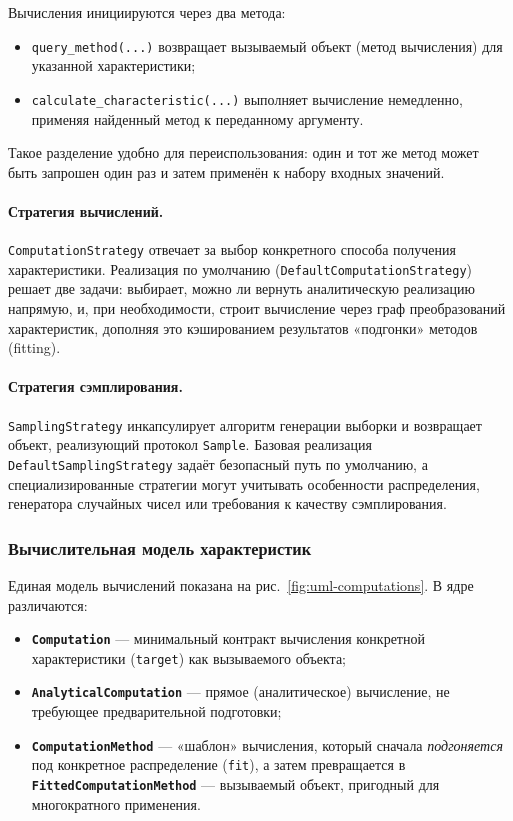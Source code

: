 Вычисления инициируются через два метода:
\begin{itemize}[compact]
  \item \texttt{query\_method(...)} возвращает вызываемый объект (метод вычисления) для указанной характеристики;
  \item \texttt{calculate\_characteristic(...)} выполняет вычисление немедленно, применяя найденный метод к переданному аргументу.
\end{itemize}
Такое разделение удобно для переиспользования: один и тот же метод может быть запрошен один раз и затем применён к набору входных значений.

\paragraph{Стратегия вычислений.}
\texttt{ComputationStrategy} отвечает за выбор конкретного способа получения характеристики. Реализация по умолчанию (\texttt{DefaultComputationStrategy}) решает две задачи: выбирает, можно ли вернуть аналитическую реализацию напрямую, и, при необходимости, строит вычисление через граф преобразований характеристик, дополняя это кэшированием результатов «подгонки» методов (fitting).

\paragraph{Стратегия сэмплирования.}
\texttt{SamplingStrategy} инкапсулирует алгоритм генерации выборки и возвращает объект, реализующий протокол \texttt{Sample}. Базовая реализация \texttt{DefaultSamplingStrategy} задаёт безопасный путь по умолчанию, а специализированные стратегии могут учитывать особенности распределения, генератора случайных чисел или требования к качеству сэмплирования.

\subsubsection{Вычислительная модель характеристик}

Единая модель вычислений показана на рис.~\ref{fig:uml-computations}. В ядре различаются:
\begin{itemize}[compact]
  \item \textbf{\texttt{Computation}} --- минимальный контракт вычисления конкретной характеристики (\texttt{target}) как вызываемого объекта;
  \item \textbf{\texttt{AnalyticalComputation}} --- прямое (аналитическое) вычисление, не требующее предварительной подготовки;
  \item \textbf{\texttt{ComputationMethod}} --- «шаблон» вычисления, который сначала \emph{подгоняется} под конкретное распределение (\texttt{fit}), а затем превращается в \textbf{\texttt{FittedComputationMethod}} --- вызываемый объект, пригодный для многократного применения.
\end{itemize}

